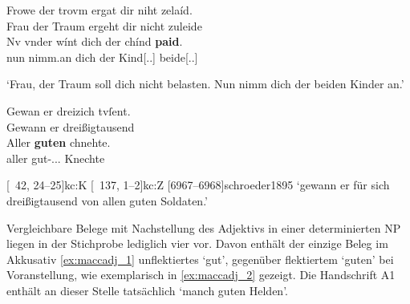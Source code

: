\begin{exe}
\ex \label{ex:chindpaid}
\begin{xlist}
	\ex \label{ex:chindpaid_1}
		\gll Frowe der trovm ergat dir niht zelaíd. \\
			Frau der Traum ergeht dir nicht zuleide \\
	\sn \gll Nv {vnder wínt} dich der chínd \textbf{paid}. \\
			nun nimm.an dich der Kind[\Gen.\Pl.\NeutM] beide[\Gen.\Pl.\NeutM] \\
		\begin{taggedline}{\parencites%
			[\pno~11\ra, 17]{kc:M}[vgl.]%
			[\pno~6\rb, 22--23]{kc:A1}
			[\pno~8\ra, 12--13]{kc:H}
			[1354]{schroeder1895}
		} %
		\trans `Frau, der Traum soll dich nicht belasten. Nun nimm dich der
			beiden Kinder an.'
		\end{taggedline}

	\ex \label{ex:chindpaid_2}
		\gll Gewan er {dreizich tvſent}. \\
			Gewann er dreißigtausend \\
	\sn \gll Aller \textbf{guten} chnehte. \\
			aller gut-\Gen.\Pl.\MascM.\Wk{} Knechte \\
		\begin{taggedline}{\parencites%
			[\pno~52\vb, 20--21]{kc:M}[vgl.]%
			[\pno~30\rb, 14--15]{kc:A1}
			[\pno~41\rb, 36--37]{kc:H}
			[\pno~19\vc, 23--24]{kc:B1}
			[\pno~33\vb, 20--21]{kc:VB}
			[\pno~42\ra, 24--25]{kc:K}
			[\pno~137\va, 1--2]{kc:Z}
			[6967--6968]{schroeder1895}
		}
		\trans `gewann er  für sich dreißigtausend
			von allen guten Soldaten.'
		\end{taggedline}
\end{xlist}
\end{exe}

Vergleichbare Belege mit Nachstellung des Adjektivs in einer determinierten NP
liegen in der Stichprobe lediglich vier vor. Davon enthält der einzige Beleg im
Akkusativ \cref{ex:maccadj_1} unflektiertes  `gut', gegenüber
flektiertem  `guten' bei Voranstellung, wie exemplarisch in
\cref{ex:maccadj_2} gezeigt. Die Handschrift A1 enthält an dieser
Stelle %
tatsächlich  `manch guten Helden'.

